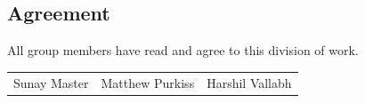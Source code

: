 \documentclass[10pt,letterpaper]{article}
\begin{document}
\subsection{Agreement}

All group members have read and agree to this division of work.

\vspace{0.5em}
\begin{tabular}{@{}p{}p{}p{}@{}}
Sunay Master & Matthew Purkiss & Harshil Vallabh \\
\end{tabular}
\endgroup

\twocolumn


\setlength{\bibleftmargin}{.125in}
\setlength{\bibindent}{-\bibleftmargin}


\onecolumn

\clearpage
{}
\end{document}
